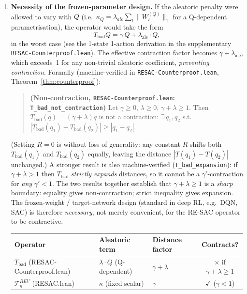 \begin{enumerate}
    \item \textbf{Necessity of the frozen-parameter design.}
    If the aleatoric penalty were allowed to vary with $Q$ (i.e.\
    $\kappa_Q = \lambda_{ale}\sum_l\|W_l^{(Q)}\|_1$ for a Q-dependent parametrisation), the operator would take the form
    \begin{equation}
        T_{\mathrm{bad}} Q = \gamma\, Q + \lambda_{\mathrm{ale}}\cdot Q, \label{eq:tbad}
    \end{equation}
    in the worst case (see the 1-state 1-action derivation in the supplementary \texttt{RESAC-Counterproof.lean}).
    The effective contraction factor becomes $\gamma + \lambda_{\mathrm{ale}}$, which exceeds~1 for any non-trivial aleatoric coefficient, \emph{preventing contraction}. Formally (machine-verified in \texttt{RESAC-Counterproof.lean}, Theorem~\ref{thm:counterproof}):
    \phantomsection\label{thm:counterproof}%
    \begin{quote}
        \textbf{(Non-contraction, \texttt{RESAC-Counterproof.lean}: \texttt{T\_bad\_not\_contraction})} Let $\gamma\ge 0$, $\lambda\ge 0$, $\gamma+\lambda\ge 1$. Then $T_{\mathrm{bad}}(q)=(\gamma+\lambda)q$ is not a contraction: $\exists\,q_1,q_2$ s.t.\ $|T_{\mathrm{bad}}(q_1)-T_{\mathrm{bad}}(q_2)|\ge|q_1-q_2|$.
    \end{quote}
    \noindent(Setting $R=0$ is without loss of generality: any constant $R$ shifts both $T_{\mathrm{bad}}(q_1)$ and $T_{\mathrm{bad}}(q_2)$ equally, leaving the distance $|T(q_1)-T(q_2)|$ unchanged.)
    A stronger result is also machine-verified (\texttt{T\_bad\_expansion}): if $\gamma+\lambda>1$ then $T_{\mathrm{bad}}$ \emph{strictly expands} distances, so it cannot be a $\gamma'$-contraction for \emph{any} $\gamma'<1$.
    The two results together establish that $\gamma+\lambda\ge 1$ is a \emph{sharp} boundary: equality gives non-contraction; strict inequality gives expansion.
    The frozen-weight / target-network design (standard in deep RL, e.g.\ DQN, SAC) is therefore \emph{necessary}, not merely convenient, for the RE-SAC operator to be contractive.

\medskip
\begin{center}
\begin{tabular}{lllc}
\toprule
\textbf{Operator} & \textbf{Aleatoric term} & \textbf{Distance factor} & \textbf{Contracts?} \\
\midrule
$T_{\mathrm{bad}}$ (RESAC-Counterproof.lean) & $\lambda\cdot Q$ (Q-dependent) & $\gamma+\lambda$ & $\times$ if $\gamma{+}\lambda\ge 1$ \\
$\mathcal{T}^{REV}_\kappa$ (RESAC.lean) & $\kappa$ (fixed scalar) & $\gamma$ & $\checkmark$ ($\gamma<1$) \\
\bottomrule
\end{tabular}
\end{center}
\medskip


\end{enumerate}
